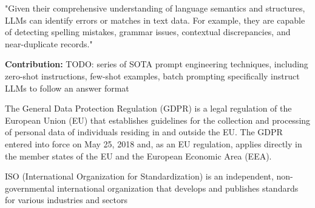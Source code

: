  "Given their comprehensive understanding of language semantics and structures, LLMs can identify errors or matches in text data. For example, they are capable of detecting spelling mistakes, grammar issues, contextual discrepancies, and near-duplicate records."

\textbf{Contribution:}
TODO: 
series of SOTA prompt engineering techniques,  including zero-shot instructions, few-shot examples, batch prompting
specifically instruct LLMs to follow an answer format


The General Data Protection Regulation (GDPR) is a legal regulation of the European Union (EU) that establishes guidelines for the collection and processing of personal data of individuals residing in and outside the EU. The GDPR entered into force on May 25, 2018 and, as an EU regulation, applies directly in the member states of the EU and the European Economic Area (EEA). 

ISO (International Organization for Standardization) is an independent, non-governmental international organization that develops and publishes standards for various industries and sectors

\newpage